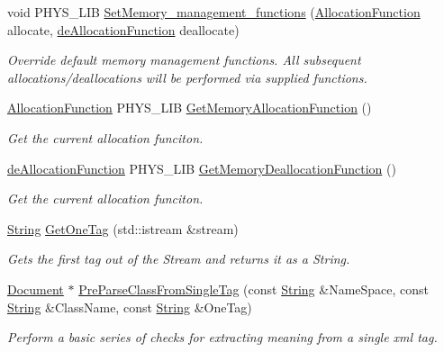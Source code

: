 \begin{DoxyCompactItemize}
void PHYS\_\-LIB \hyperlink{namespacephys_1_1xml_a2ad88e4331ac29a86c99d5e40b31f983}{SetMemory\_\-management\_\-functions} (\hyperlink{namespacephys_1_1xml_a6d772c4cf52d017d4d6ad68ddcbd493f}{AllocationFunction} allocate, \hyperlink{namespacephys_1_1xml_af98b1cb6640aa712180aad89a1c776d8}{deAllocationFunction} deallocate)
\begin{DoxyCompactList}\small\item\em Override default memory management functions. All subsequent allocations/deallocations will be performed via supplied functions. \item\end{DoxyCompactList}\item 
\hyperlink{namespacephys_1_1xml_a6d772c4cf52d017d4d6ad68ddcbd493f}{AllocationFunction} PHYS\_\-LIB \hyperlink{namespacephys_1_1xml_a0537fb34f1fa41afd138deead1455a5b}{GetMemoryAllocationFunction} ()
\begin{DoxyCompactList}\small\item\em Get the current allocation funciton. \item\end{DoxyCompactList}\item 
\hyperlink{namespacephys_1_1xml_af98b1cb6640aa712180aad89a1c776d8}{deAllocationFunction} PHYS\_\-LIB \hyperlink{namespacephys_1_1xml_a1a2ff3e010e4627424a65a2e584e441e}{GetMemoryDeallocationFunction} ()
\begin{DoxyCompactList}\small\item\em Get the current allocation funciton. \item\end{DoxyCompactList}\item 
\hyperlink{namespacephys_1_1xml_a4d8ca7638328d16d303e5a4c849f4704}{String} \hyperlink{namespacephys_1_1xml_a9d912900518f0d84d323d1514dfb93a2}{GetOneTag} (std::istream \&stream)
\begin{DoxyCompactList}\small\item\em Gets the first tag out of the Stream and returns it as a String. \item\end{DoxyCompactList}\item 
\hyperlink{classphys_1_1xml_1_1Document}{Document} $\ast$ \hyperlink{namespacephys_1_1xml_a61f614191fad81859f2aa87a80f6bb36}{PreParseClassFromSingleTag} (const \hyperlink{namespacephys_1_1xml_a4d8ca7638328d16d303e5a4c849f4704}{String} \&NameSpace, const \hyperlink{namespacephys_1_1xml_a4d8ca7638328d16d303e5a4c849f4704}{String} \&ClassName, const \hyperlink{namespacephys_1_1xml_a4d8ca7638328d16d303e5a4c849f4704}{String} \&OneTag)
\begin{DoxyCompactList}\small\item\em Perform a basic series of checks for extracting meaning from a single xml tag. \item\end{DoxyCompactList}\end{DoxyCompactItemize}
